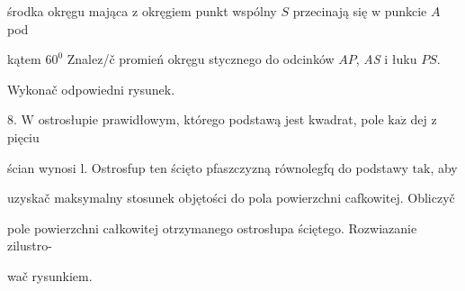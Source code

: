 \documentclass[a4paper,12pt]{article}
\begin{document}
środka okręgu mająca $\mathrm{z}$ okręgiem punkt wspólny $S$ przecinają się $\mathrm{w}$ punkcie $A$ pod

kątem $60^{0}$ Znalez/č promień okręgu stycznego do odcinków $AP$, {\it AS} $\mathrm{i}$ łuku $PS.$

Wykonač odpowiedni rysunek.

8. $\mathrm{W}$ ostrosłupie prawidłowym, którego podstawą jest kwadrat, pole $\mathrm{k}\mathrm{a}\dot{\mathrm{z}}$ dej $\mathrm{z}$ pięciu

ścian wynosi l. Ostrosfup ten ścięto pfaszczyzną równolegfq do podstawy $\mathrm{t}\mathrm{a}\mathrm{k}$, aby

uzyskač maksymalny stosunek objętości do pola powierzchni cafkowitej. Obliczyč

pole powierzchni całkowitej otrzymanego ostrosłupa ściętego. Rozwiazanie zilustro-

wač rysunkiem.
\end{document}
